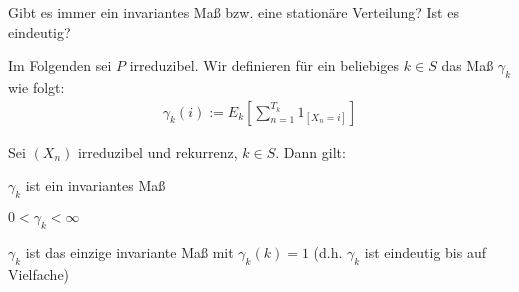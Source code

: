 \documentclass[a4paper,twoside,DIV15,BCOR12mm]{scrbook}
\begin{document}
Gibt es immer ein invariantes Maß bzw. eine stationäre Verteilung? Ist es eindeutig?

Im Folgenden sei $P$ irreduzibel. Wir definieren für ein beliebiges $k \in S$ das Maß $\gamma_k$ wie folgt:
\begin{align*}
  \gamma_k(i) := E_k[\sum_{n=1}^{T_k} 1_{[X_n = i]}]
\end{align*}


\begin{satz}
\label{satz3.1}
  Sei $(X_n)$ irreduzibel und rekurrenz, $k \in S$. Dann gilt:
  \begin{enuma}
  \item $\gamma_k$ ist ein invariantes Maß
  \item $0 < \gamma_k < \infty$
  \item $\gamma_k$ ist das einzige invariante Maß mit $\gamma_k(k) = 1$ (d.h. $\gamma_k$ ist eindeutig bis auf Vielfache)
  \end{enuma}
\end{satz}
\end{document}
